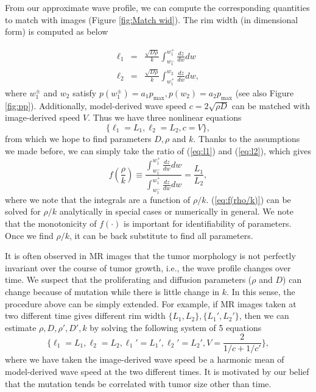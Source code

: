 \documentclass{aims}
\numberwithin{equation}{section}
\begin{document}
From our approximate wave profile, we can compute the corresponding
quantities to match with images (Figure \ref{fig:Match wid}). The
rim width (in dimensional form) is computed as below

\begin{subequations}
\begin{eqnarray}
\ell_{1} & = & \frac{\sqrt{D\rho}}{k}\int_{w_{1}^{-}}^{w_{1}^{+}}\frac{dz}{dw}dw\label{eq:l1}\\
\ell_{2} & = & \frac{\sqrt{D\rho}}{k}\int_{w_{1}^{+}}^{w_{2}}\frac{dz}{dw}dw,\label{eq:l2}
\end{eqnarray}
\end{subequations}where $w_{1}^{\pm}$ and $w_{2}$ satisfy $p(w_{1}^{\pm})=a_{1}p_{\text{max}},p(w_{2})=a_{2}p_{\max}$
(see also Figure \ref{fig:pp}). Additionally, model-derived wave
speed $c=2\sqrt{\rho D}$ can be matched with image-derived speed
$V$. Thus we have three nonlinear equations 
\begin{equation}
\{\ell_{1}=L_{1},\ell_{2}=L_{2},c=V\},\label{eq:l1l2c}
\end{equation}
 from which we hope to find parameters $D,\rho$ and $k$. Thanks
to the assumptions we made before, we can simply take the ratio of
(\ref{eq:l1}) and (\ref{eq:l2}), which gives 
\begin{equation}
f(\frac{\rho}{k})\equiv\frac{\int_{w_{1}^{-}}^{w_{1}^{+}}\frac{dz}{dw}dw}{\int_{w_{1}^{-}}^{w_{1}^{+}}\frac{dz}{dw}dw}=\frac{L_{1}}{L_{2}},\label{eq:f(rho/k)}
\end{equation}
where we note that the integrals are a function of $\rho/k$. (\ref{eq:f(rho/k)})
can be solved for $\rho/k$ analytically in special cases or numerically
in general. We note that the monotonicity of $f(\cdot)$ is important
for identifiability of parameters. Once we find $\rho/k$, it can
be back substitute to find all parameters. 

It is often observed in MR images that the tumor morphology is not
perfectly invariant over the course of tumor growth, i.e., the wave
profile changes over time. We suspect that the proliferating and diffusion
parameters ($\rho$ and $D$) can change because of mutation while
there is little change in $k$. In this sense, the procedure above
can be simply extended. For example, if MR images taken at two different
time gives different rim width $\{L_{1},L_{2}\},\{L_{1}',L_{2}'\}$,
then we can estimate $\rho,D,\rho',D',k$ by solving the following
system of 5 equations 
\[
\{\ell_{1}=L_{1},\ell_{2}=L_{2},\ell_{1}'=L_{1}',\ell_{2}'=L_{2}',V=\frac{2}{1/c+1/c'}\},
\]
where we have taken the image-derived wave speed be a harmonic mean
of model-derived wave speed at the two different times. It is motivated
by our belief that the mutation tends be correlated with tumor size
other than time. 
\end{document}

